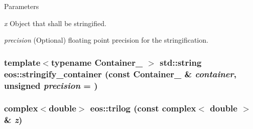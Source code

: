 \begin{DoxyParams}{Parameters}
\item[{\em x}]Object that shall be stringified. \item[{\em precision}](Optional) floating point precision for the stringification. \end{DoxyParams}
\hypertarget{namespaceeos_ae90d5cf81cb527f4088dd11daf1e456d}{
\subsubsection[{stringify\_\-container}]{\setlength{\rightskip}{0pt plus 5cm}template$<$typename Container\_\- $>$ std::string eos::stringify\_\-container (const Container\_\- \& {\em container}, \/  unsigned {\em precision} = {})}}
\label{namespaceeos_ae90d5cf81cb527f4088dd11daf1e456d}
\hypertarget{namespaceeos_a38a0279ef72ff9c1bdb17dd7956a199a}{
\subsubsection[{trilog}]{\setlength{\rightskip}{0pt plus 5cm}complex$<$double$>$ eos::trilog (const complex$<$ double $>$ \& {\em z})}}
\label{namespaceeos_a38a0279ef72ff9c1bdb17dd7956a199a}
